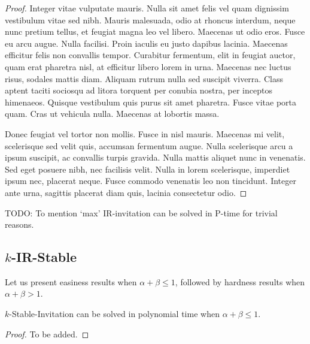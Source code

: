 \begin{proof}
Integer vitae vulputate mauris. Nulla sit amet felis vel quam dignissim vestibulum vitae sed nibh. Mauris malesuada, odio at rhoncus interdum, neque nunc pretium tellus, et feugiat magna leo vel libero. Maecenas ut odio eros. Fusce eu arcu augue. Nulla facilisi. Proin iaculis eu justo dapibus lacinia. Maecenas efficitur felis non convallis tempor. Curabitur fermentum, elit in feugiat auctor, quam erat pharetra nisl, at efficitur libero lorem in urna. Maecenas nec luctus risus, sodales mattis diam. Aliquam rutrum nulla sed suscipit viverra. Class aptent taciti sociosqu ad litora torquent per conubia nostra, per inceptos himenaeos. Quisque vestibulum quis purus sit amet pharetra. Fusce vitae porta quam. Cras ut vehicula nulla. Maecenas at lobortis massa.

Donec feugiat vel tortor non mollis. Fusce in nisl mauris. Maecenas mi velit, scelerisque sed velit quis, accumsan fermentum augue. Nulla scelerisque arcu a ipsum suscipit, ac convallis turpis gravida. Nulla mattis aliquet nunc in venenatis. Sed eget posuere nibh, nec facilisis velit. Nulla in lorem scelerisque, imperdiet ipsum nec, placerat neque. Fusce commodo venenatis leo non tincidunt. Integer ante urna, sagittis placerat diam quis, lacinia consectetur odio.	
\end{proof}

TODO: To mention `max' IR-invitation can be solved in P-time for trivial reasons.



\subsection{$k$-IR-Stable}

Let us present easiness results when $\alpha + \beta \leq 1$, followed by hardness results when $\alpha + \beta > 1$. 

\begin{theorem} \label{SIP:thm:stable_invitation_P}
	$k$-Stable-Invitation can be solved in polynomial time when $\alpha + \beta \leq 1$.
\end{theorem} 
\begin{proof} %
	To be added.
\end{proof}

